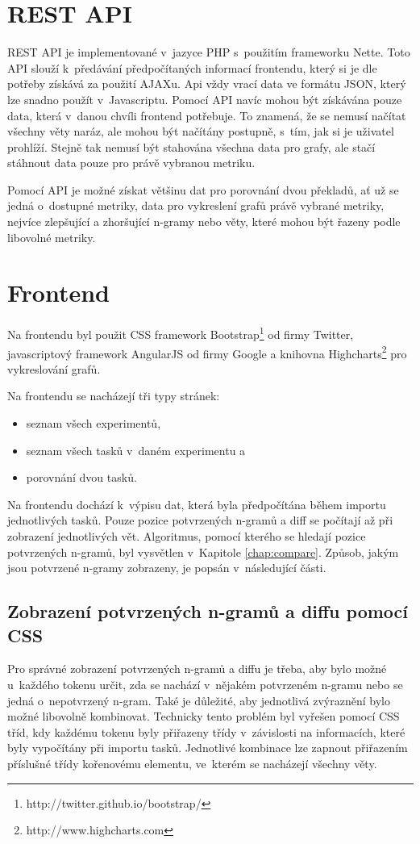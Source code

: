 \section{REST API}
REST API je implementované v~jazyce PHP s~použitím frameworku Nette.
Toto API slouží k~předávání předpočítaných informací frontendu,
  který si je dle potřeby získává za použití AJAXu.
Api vždy vrací data ve formátu JSON,
  který lze snadno použít v~Javascriptu.
Pomocí API navíc mohou být získávána pouze data,
  která v~danou chvíli frontend potřebuje.
To znamená, že se nemusí načítat všechny věty naráz,
  ale mohou být načítány postupně,
  s~tím, jak si je uživatel prohlíží.
Stejně tak nemusí být stahována všechna data pro grafy,
  ale stačí stáhnout data pouze pro právě vybranou metriku.

Pomocí API je možné získat většinu dat pro porovnání dvou překladů,
  ať už se jedná o~dostupné metriky,
  data pro vykreslení grafů právě vybrané metriky,
  nejvíce zlepšující a zhoršující \mbox{n-gramy}
  nebo věty,
  které mohou být řazeny podle libovolné metriky.

\section{Frontend}
Na frontendu byl použit CSS framework Bootstrap\footnote{http://twitter.github.io/bootstrap/} od firmy Twitter,
  javascriptový framework AngularJS od firmy Google
  a knihovna Highcharts\footnote{http://www.highcharts.com} pro vykreslování grafů.

Na frontendu se nacházejí tři typy stránek:
\begin{itemize}
  \item seznam všech experimentů,
  \item seznam všech tasků v~daném experimentu a
  \item porovnání dvou tasků.
\end{itemize}

Na frontendu dochází k~výpisu dat, která byla předpočítána během importu jednotlivých tasků.
Pouze pozice potvrzených \mbox{n-gramů} a diff se počítají až při zobrazení jednotlivých vět.
Algoritmus, pomocí kterého se hledají pozice potvrzených \mbox{n-gramů}, byl vysvětlen v~Kapitole \ref{chap:compare}.
Způsob, jakým jsou potvrzené \mbox{n-gramy} zobrazeny, je popsán v~následující části.

\subsection{Zobrazení potvrzených \mbox{n-gramů} a diffu pomocí CSS}
Pro správné zobrazení potvrzených \mbox{n-gramů} a diffu je třeba,
  aby bylo možné u~každého tokenu určit,
  zda se nachází v~nějakém potvrzeném \mbox{n-gramu} nebo se jedná o~nepotvrzený \mbox{n-gram}.
Také je důležité,
  aby jednotlivá zvýraznění bylo možné libovolně kombinovat.
Technicky tento problém byl vyřešen pomocí CSS tříd,
  kdy každému tokenu byly přiřazeny třídy v~závislosti na informacích,
  které byly vypočítány při importu tasků.
Jednotlivé kombinace lze zapnout přiřazením příslušné třídy kořenovému elementu,
  ve~kterém se nacházejí všechny věty.

